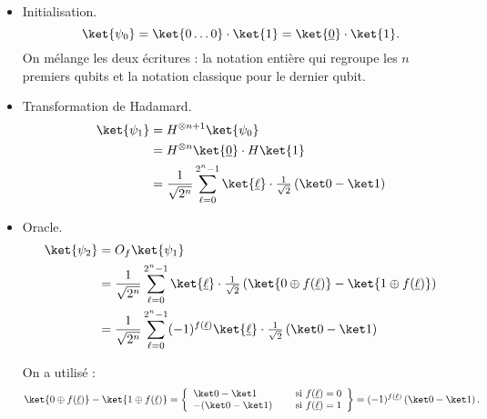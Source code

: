 \documentclass[11pt,class=report,crop=false]{standalone}
\begin{document}
\begin{itemize}
  \item Initialisation.
  $$\ket{\psi_0} = \ket{0\ldots0} \cdot \ket{1} = \ket{\underline{0}} \cdot \ket{1}.$$
  On mélange les deux écritures : la notation entière qui regroupe les $n$ premiers qubits et la notation classique pour le dernier qubit. 

  \item Transformation de Hadamard.
\begin{align*}
\ket{\psi_1} 
  &= H^{\otimes n+1} \ket{\psi_0} \\
  &= H^{\otimes n}\ket{\underline{0}} \cdot H\ket{1} \\
  &= \frac{1}{\sqrt{2^n}} \sum_{\ell=0}^{2^n-1} \ket{\underline\ell} \cdot \tfrac{1}{\sqrt{2}}\left(\ket0 - \ket1\right) \\
\end{align*}


  \item Oracle.
\begin{align*}
\ket{\psi_2} 
  &= O_f \ket{\psi_1} \\
  &= \frac{1}{\sqrt{2^{n}}} \sum_{\ell=0}^{2^n-1} \ket{\underline\ell} \cdot \tfrac{1}{\sqrt{2}}\left(\ket{0\oplus f(\underline{\ell})} - \ket{1\oplus f(\underline{\ell})}\right) \\
  &= \frac{1}{\sqrt{2^{n}}}\sum_{\ell=0}^{2^n-1} (-1)^{f(\underline\ell)} \ket{\underline\ell} \cdot \tfrac{1}{\sqrt{2}}\left(\ket0 - \ket1\right) \\
\end{align*}  

On a utilisé : 
$$
\ket{0\oplus f(\underline{\ell})} - \ket{1\oplus f(\underline{\ell})}
 = 
\left\{ 
\begin{array}{ll}
\ket0-\ket1 & \quad \text{ si } f(\underline \ell)=0 \\
-(\ket0-\ket1) & \quad \text{ si } f(\underline \ell)=1 \\
\end{array}\right\}
= (-1)^{f(\underline\ell)}\left(\ket0 - \ket1\right).$$


\end{itemize}
\end{document}
